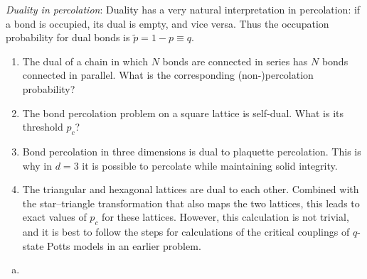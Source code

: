 \begin{problem}
    \textit{Duality in percolation}: Duality has a very natural interpretation in percolation: if a bond is occupied, its dual is empty, and vice versa. Thus the occupation probability for dual bonds is $\tilde{p} = 1 - p \equiv q$.

    \begin{enumerate}
        \item[(a)] The dual of a chain in which $N$ bonds are connected in series has $N$ bonds connected in parallel. What is the corresponding (non-)percolation probability?

        \item[(b)] The bond percolation problem on a square lattice is self-dual. What is its threshold $p_c$?

        \item[(c)] Bond percolation in three dimensions is dual to plaquette percolation. This is why in $d = 3$ it is possible to percolate while maintaining solid integrity.

        \item[(d)] The triangular and hexagonal lattices are dual to each other. Combined with the star--triangle transformation that also maps the two lattices, this leads to exact values of $p_c$ for these lattices. However, this calculation is not trivial, and it is best to follow the steps for calculations of the critical couplings of $q$-state Potts models in an earlier problem.
    \end{enumerate}
\end{problem}

\begin{solution}
    \begin{enumerate}[(a)]
        \item
    \end{enumerate}
\end{solution}

